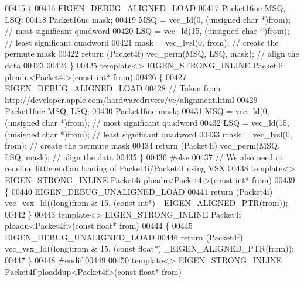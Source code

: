 \begin{DoxyCode}
{00415 \{
00416   EIGEN\_DEBUG\_ALIGNED\_LOAD
00417   Packet16uc MSQ, LSQ;
00418   Packet16uc mask;
00419   MSQ = vec\_ld(0, (\textcolor{keywordtype}{unsigned} \textcolor{keywordtype}{char} *)from);          \textcolor{comment}{// most significant quadword}
00420   LSQ = vec\_ld(15, (\textcolor{keywordtype}{unsigned} \textcolor{keywordtype}{char} *)from);         \textcolor{comment}{// least significant quadword}
00421   mask = vec\_lvsl(0, from);                        \textcolor{comment}{// create the permute mask}
00422   \textcolor{keywordflow}{return} (Packet4f) vec\_perm(MSQ, LSQ, mask);           \textcolor{comment}{// align the data}
00423 
00424 \}
00425 \textcolor{keyword}{template}<> EIGEN\_STRONG\_INLINE Packet4i ploadu<Packet4i>(\textcolor{keyword}{const} \textcolor{keywordtype}{int}* from)
00426 \{
00427   EIGEN\_DEBUG\_ALIGNED\_LOAD
00428   \textcolor{comment}{// Taken from http://developer.apple.com/hardwaredrivers/ve/alignment.html}
00429   Packet16uc MSQ, LSQ;
00430   Packet16uc mask;
00431   MSQ = vec\_ld(0, (\textcolor{keywordtype}{unsigned} \textcolor{keywordtype}{char} *)from);          \textcolor{comment}{// most significant quadword}
00432   LSQ = vec\_ld(15, (\textcolor{keywordtype}{unsigned} \textcolor{keywordtype}{char} *)from);         \textcolor{comment}{// least significant quadword}
00433   mask = vec\_lvsl(0, from);                        \textcolor{comment}{// create the permute mask}
00434   \textcolor{keywordflow}{return} (Packet4i) vec\_perm(MSQ, LSQ, mask);    \textcolor{comment}{// align the data}
00435 \}
00436 \textcolor{preprocessor}{#else}
00437 \textcolor{comment}{// We also need ot redefine little endian loading of Packet4i/Packet4f using VSX}
00438 \textcolor{keyword}{template}<> EIGEN\_STRONG\_INLINE Packet4i ploadu<Packet4i>(\textcolor{keyword}{const} \textcolor{keywordtype}{int}* from)
00439 \{
00440   EIGEN\_DEBUG\_UNALIGNED\_LOAD
00441   \textcolor{keywordflow}{return} (Packet4i) vec\_vsx\_ld((\textcolor{keywordtype}{long})from & 15, (\textcolor{keyword}{const} \textcolor{keywordtype}{int}*) \_EIGEN\_ALIGNED\_PTR(from));
00442 \}
00443 \textcolor{keyword}{template}<> EIGEN\_STRONG\_INLINE Packet4f ploadu<Packet4f>(\textcolor{keyword}{const} \textcolor{keywordtype}{float}* from)
00444 \{
00445   EIGEN\_DEBUG\_UNALIGNED\_LOAD
00446   \textcolor{keywordflow}{return} (Packet4f) vec\_vsx\_ld((\textcolor{keywordtype}{long})from & 15, (\textcolor{keyword}{const} \textcolor{keywordtype}{float}*) \_EIGEN\_ALIGNED\_PTR(from));
00447 \}
00448 \textcolor{preprocessor}{#endif}
00449 
00450 \textcolor{keyword}{template}<> EIGEN\_STRONG\_INLINE Packet4f ploaddup<Packet4f>(\textcolor{keyword}{const} \textcolor{keywordtype}{float}*   from)
}
\end{DoxyCode}
